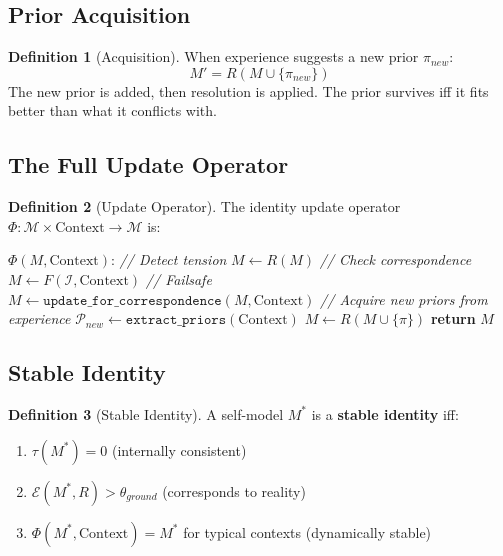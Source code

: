\documentclass[12pt,a4paper]{article}
\theoremstyle{definition}
\newtheorem{definition}{Definition}[section]
\begin{document}
\subsection{Prior Acquisition}

\begin{definition}[Acquisition]
When experience suggests a new prior $\pi_{new}$:
\[ M' = R(M \cup \{\pi_{new}\}) \]
The new prior is added, then resolution is applied. The prior survives iff it fits better than what it conflicts with.
\end{definition}

\subsection{The Full Update Operator}

\begin{definition}[Update Operator]
The identity update operator $\Phi: \mathcal{M} \times \text{Context} \to \mathcal{M}$ is:
\begin{algorithmic}
\STATE $\Phi(M, \text{Context})$:
\STATE \textit{// Detect tension}
    \STATE $M \gets R(M)$
\ENDIF
\STATE \textit{// Check correspondence}
        \STATE $M \gets F(\mathcal{I}, \text{Context})$ \textit{// Failsafe}
    \ELSE
        \STATE $M \gets \texttt{update\_for\_correspondence}(M, \text{Context})$
    \ENDIF
\ENDIF
\STATE \textit{// Acquire new priors from experience}
\STATE $\mathcal{P}_{new} \gets \texttt{extract\_priors}(\text{Context})$
    \STATE $M \gets R(M \cup \{\pi\})$
\ENDFOR
\STATE \textbf{return} $M$
\end{algorithmic}
\end{definition}

\subsection{Stable Identity}

\begin{definition}[Stable Identity]
A self-model $M^*$ is a \textbf{stable identity} iff:
\begin{enumerate}
    \item $\tau(M^*) = 0$ (internally consistent)
    \item $\mathcal{E}(M^*, R) > \theta_{ground}$ (corresponds to reality)
    \item $\Phi(M^*, \text{Context}) = M^*$ for typical contexts (dynamically stable)
\end{enumerate}
\end{definition}
\end{document}
